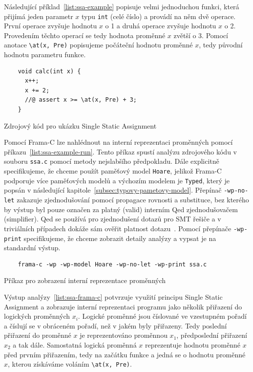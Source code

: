 Následující příklad~\ref{list:ssa-example} popisuje velmi jednoduchou funkci,
která přijímá jeden parametr $x$ typu \texttt{int} (celé číslo) a provádí na něm dvě operace.
První operace zvyšuje hodnotu $x$ o 1 a druhá operace zvyšuje hodnotu $x$ o 2.
Provedením těchto operací se tedy hodnota proměnné $x$ zvětší o 3.
Pomocí anotace \texttt{\textbackslash at(x, Pre)} popisujeme počáteční hodnotu proměnné $x$,
tedy původní hodnotu parametru funkce.

\begin{listing}[H]
    \begin{verbatim}
    void calc(int x) {
      x++;
      x += 2;
      //@ assert x >= \at(x, Pre) + 3;
    }
    \end{verbatim}
    \caption{Zdrojový kód pro ukázku Single Static Assignment}
    \label{list:ssa-example}
\end{listing}

Pomocí Frama\mbox{-}C lze nahlédnout na interní reprezentaci proměnných pomocí příkazu~\ref{list:ssa-example-run}.
Tento příkaz spustí analýzu zdrojového kódu v souboru \texttt{ssa.c} pomocí metody nejslabšího předpokladu.
Dále explicitně specifikujeme, že chceme použít paměťový model \texttt{Hoare},
jelikož Frama\mbox{-}C podporuje více paměťových modelů a výchozím modelem je \texttt{Typed},
který je popsán v následující kapitole~\ref{subsec:typovy-pametovy-model}.
Přepínač \texttt{-wp-no-let} zakazuje zjednodušování pomocí propagace rovnosti a substituce,
bez kterého by výstup byl pouze označen za platný (valid) interním Qed zjednodušovačem (simplifier).
Qed se používá pro zjednodušení dotazů pro SMT řešiče a v triviálních případech dokáže sám ověřit platnost dotazu~\cite{WPManual, BlanchardWP2024}.
Pomocí přepínače \texttt{-wp-print} specifikujeme, že chceme zobrazit detaily analýzy a vypsat je na standardní výstup.

\begin{listing}[H]
    \begin{verbatim}
    frama-c -wp -wp-model Hoare -wp-no-let -wp-print ssa.c
    \end{verbatim}
    \caption{Příkaz pro zobrazení interní reprezentace proměnných}
    \label{list:ssa-example-run}
\end{listing}

Výstup analýzy~\ref{list:ssa-frama-c} potvrzuje využití principu Single Static Assignment
a zobrazuje interní reprezentaci programu jako několik přiřazení do logických proměnných $x_i$.
Logické proměnné jsou číslované ve vzestupném pořadí a číslují se v obráceném pořadí, než v jakém byly přiřazeny.
Tedy poslední přiřazení do proměnné $x$ je reprezentováno proměnnou $x_1$, předposlední přiřazení $x_2$ a tak dále.
Samostatná logická proměnná $x$ reprezentuje hodnotu proměnné $x$ před prvním přiřazením,
tedy na začátku funkce a jedná se o hodnotu proměnné $x$, kterou získáváme voláním \texttt{\textbackslash at(x, Pre)}.

